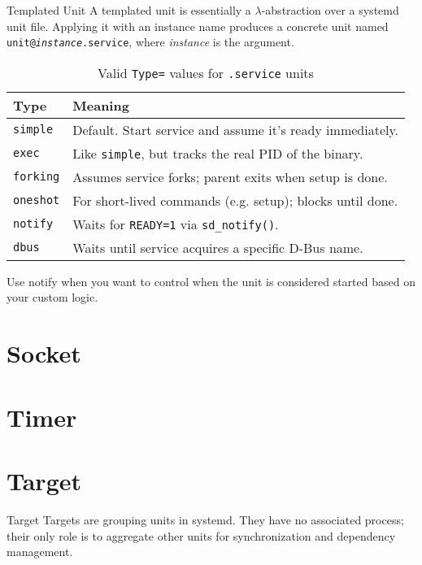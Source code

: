 \documentclass[openany, 12pt]{book}
\begin{document}
\begin{intuition}{Templated Unit}{}
  A templated unit is essentially a $\lambda$-abstraction over a systemd unit
  file. Applying it with an instance name produces a concrete unit named
  \texttt{unit@\textit{instance}.service}, where \textit{instance} is the
  argument.
\end{intuition}

\begin{table}[ht]
  \centering
  \begin{tabular}{@{}ll@{}}
    \toprule
    \textbf{Type}    & \textbf{Meaning}                                             \\
    \midrule
    \texttt{simple}  & Default. Start service and assume it's ready immediately.    \\
    \texttt{exec}    & Like \texttt{simple}, but tracks the real PID of the binary. \\
    \texttt{forking} & Assumes service forks; parent exits when setup is done.      \\
    \texttt{oneshot} & For short-lived commands (e.g. setup); blocks until done.    \\
    \texttt{notify}  & Waits for \texttt{READY=1} via \texttt{sd\_notify()}.        \\
    \texttt{dbus}    & Waits until service acquires a specific D-Bus name.          \\
    \bottomrule
  \end{tabular}
  \caption{Valid \texttt{Type=} values for \texttt{.service} units}
\end{table}

Use notify when you want to control when the unit is considered started based on
your custom logic.

\section{Socket}

\section{Timer}

\section{Target}
\begin{definition}{Target}{}
  Targets are grouping units in systemd. They have no associated process;
  their only role is to aggregate other units for synchronization and
  dependency management.
\end{definition}
\end{document}
